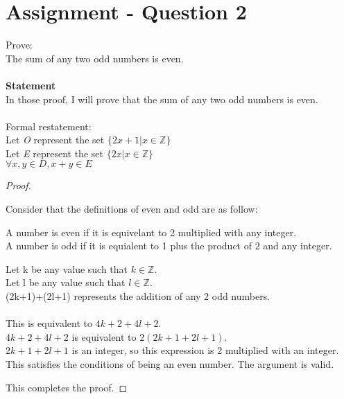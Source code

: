 \documentclass{article}
\begin{document}
\section*{Assignment - Question 2}
Prove: \\
The sum of any two odd numbers is even.\\\\
\textbf{Statement}\\
In those proof, I will prove that the sum of any two odd numbers is even.\\\\
Formal restatement:\\
Let \textit{O} represent the set $\{2x+1 | x \in \mathbb{Z}\}$\\
Let \textit{E} represent the set $\{2x | x \in \mathbb{Z}\}$\\
$\forall x,y \in D, x+y \in E$
\begin{proof}
  \begin{addmargin}{1em}
  Consider that the definitions of even and odd are as follow:\\
  \begin{addmargin}{1em}
    A number is even if it is equivelant to 2 multiplied with any integer.\\
    A number is odd if it is equialent to 1 plus the product of 2 and any integer.\\
  \end{addmargin}
  Let k be any value such that $k \in \mathbb{Z}$.\\
  Let l be any value such that $l \in \mathbb{Z}$.\\
  (2k+1)+(2l+1) represents the addition of any 2 odd numbers.\\\\
  This is equivalent to $4k+2+4l+2$.\\
  $4k+2+4l+2$ is equivalent to $2(2k+1+2l+1)$.\\
  $2k+1+2l+1$ is an integer, so this expression is 2 multiplied with an integer.\\
  This satisfies the conditions of being an even number. The argument is valid.\\
  
  \end{addmargin}
  This completes the proof.
\end{proof}
\end{document}

